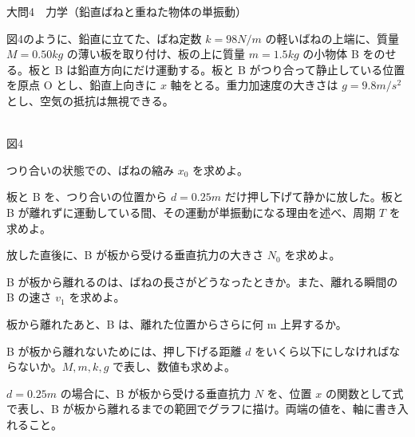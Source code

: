 \documentclass[paper=b5, fontsize=8pt, fleqn, twoside]{jlreq}
\begin{document}
\clearpage
\begin{ascolorbox4A}[75点・30分]{大問4　力学（鉛直ばねと重ねた物体の単振動）}
\par\noindent
\begin{minipage}[t]{0.62\linewidth}\vspace{0pt}
図4のように、鉛直に立てた、ばね定数 $k=98\unit{N/m}$ の軽いばねの上端に、質量 $M=0.50\unit{kg}$ の薄い板を取り付け、板の上に質量 $m=1.5\unit{kg}$ の小物体 B をのせる。板と B は鉛直方向にだけ運動する。板と B がつり合って静止している位置を原点 $\mathrm{O}$ とし、鉛直上向きに $x$ 軸をとる。重力加速度の大きさは $g=9.8\unit{m/s^2}$ とし、空気の抵抗は無視できる。
\end{minipage}\hfill
\begin{minipage}[t]{0.33\linewidth}\vspace{0pt}\centering
{}\\[1pt]{\small 図4}
\end{minipage}
\begin{qlist}[series=ud]
\item つり合いの状態での、ばねの縮み $x_0$ を求めよ。
\item 板と B を、つり合いの位置から $d=0.25\unit{m}$ だけ押し下げて静かに放した。板と B が離れずに運動している間、その運動が単振動になる理由を述べ、周期 $T$ を求めよ。
\item 放した直後に、B が板から受ける垂直抗力の大きさ $N_0$ を求めよ。
\item B が板から離れるのは、ばねの長さがどうなったときか。また、離れる瞬間の B の速さ $v_1$ を求めよ。
\item 板から離れたあと、B は、離れた位置からさらに何 $\mathrm{m}$ 上昇するか。
\item B が板から離れないためには、押し下げる距離 $d$ をいくら以下にしなければならないか。$M,m,k,g$ で表し、数値も求めよ。
\item $d=0.25\unit{m}$ の場合に、B が板から受ける垂直抗力 $N$ を、位置 $x$ の関数として式で表し、B が板から離れるまでの範囲でグラフに描け。両端の値を、軸に書き入れること。
\end{qlist}
\end{ascolorbox4A}
\end{document}
